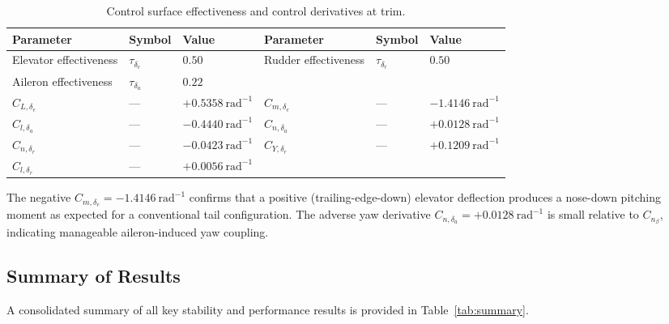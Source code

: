 \begin{table}[H]
  \centering
  \caption{Control surface effectiveness and control derivatives at trim.}
  \label{tab:control_derivs}
  \begin{tabular}{lll lll}
    \toprule
    \textbf{Parameter} & \textbf{Symbol} & \textbf{Value}
    & \textbf{Parameter} & \textbf{Symbol} & \textbf{Value} \\
    \midrule
    Elevator effectiveness  & $\tau_{\delta_e}$ & $0.50$
    & Rudder effectiveness  & $\tau_{\delta_r}$ & $0.50$ \\
    Aileron effectiveness   & $\tau_{\delta_a}$ & $0.22$
    & & & \\[4pt]
    $C_{L,\delta_e}$  & --- & $+0.5358~\text{rad}^{-1}$
    & $C_{m,\delta_e}$ & --- & $-1.4146~\text{rad}^{-1}$ \\
    $C_{l,\delta_a}$  & --- & $-0.4440~\text{rad}^{-1}$
    & $C_{n,\delta_a}$ & --- & $+0.0128~\text{rad}^{-1}$ \\
    $C_{n,\delta_r}$  & --- & $-0.0423~\text{rad}^{-1}$
    & $C_{Y,\delta_r}$ & --- & $+0.1209~\text{rad}^{-1}$ \\
    $C_{l,\delta_r}$  & --- & $+0.0056~\text{rad}^{-1}$
    & & & \\
    \bottomrule
  \end{tabular}
\end{table}

The negative $C_{m,\delta_e} = -1.4146~\text{rad}^{-1}$ confirms that a positive (trailing-edge-down) elevator deflection produces a nose-down pitching moment as expected for a conventional tail configuration. The adverse yaw derivative $C_{n,\delta_a} = +0.0128~\text{rad}^{-1}$ is small relative to $C_{n_\beta}$, indicating manageable aileron-induced yaw coupling.

\subsection{Summary of Results}
\label{subsec:summary}

A consolidated summary of all key stability and performance results is provided in Table~\ref{tab:summary}.

